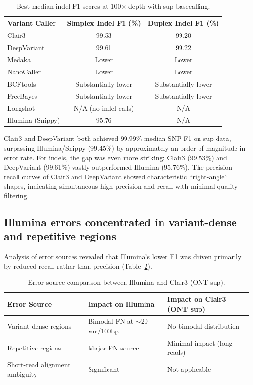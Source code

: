 \documentclass[11pt]{article}
\begin{document}
\begin{table}[ht]
\centering
\caption{Best median indel F1 scores at 100$\times$ depth with sup basecalling.}
\label{tab:indelf1}
\begin{tabular}{lcc}
\toprule
Variant Caller & Simplex Indel F1 (\%) & Duplex Indel F1 (\%) \\
\midrule
Clair3 & 99.53 & 99.20 \\
DeepVariant & 99.61 & 99.22 \\
Medaka & Lower & Lower \\
NanoCaller & Lower & Lower \\
BCFtools & Substantially lower & Substantially lower \\
FreeBayes & Substantially lower & Substantially lower \\
Longshot & N/A (no indel calls) & N/A \\
Illumina (Snippy) & 95.76 & N/A \\
\bottomrule
\end{tabular}
\end{table}

Clair3 and DeepVariant both achieved 99.99\% median SNP F1 on sup data, surpassing Illumina/Snippy (99.45\%) by approximately an order of magnitude in error rate. For indels, the gap was even more striking: Clair3 (99.53\%) and DeepVariant (99.61\%) vastly outperformed Illumina (95.76\%). The precision-recall curves of Clair3 and DeepVariant showed characteristic ``right-angle'' shapes, indicating simultaneous high precision and recall with minimal quality filtering.

\subsection{Illumina errors concentrated in variant-dense and repetitive regions}

Analysis of error sources revealed that Illumina's lower F1 was driven primarily by reduced recall rather than precision (Table~\ref{tab:errors}).

\begin{table}[ht]
\centering
\caption{Error source comparison between Illumina and Clair3 (ONT sup).}
\label{tab:errors}
\begin{tabular}{lll}
\toprule
Error Source & Impact on Illumina & Impact on Clair3 (ONT sup) \\
\midrule
Variant-dense regions & Bimodal FN at $\sim$20 var/100bp & No bimodal distribution \\
Repetitive regions & Major FN source & Minimal impact (long reads) \\
Short-read alignment ambiguity & Significant & Not applicable \\
\bottomrule
\end{tabular}
\end{table}
\end{document}
